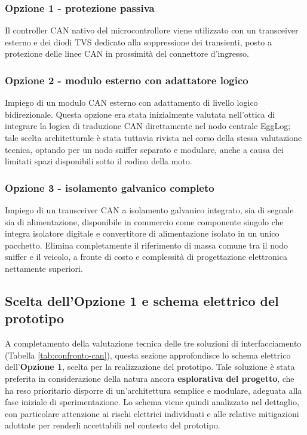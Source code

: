 \subsubsection{Opzione 1 - protezione passiva}
Il controller CAN nativo del microcontrollore viene utilizzato con un transceiver esterno e dei diodi TVS dedicato alla soppressione 
dei \gls{transienti}, posto a protezione delle linee CAN in prossimità del connettore d'ingresso.

\subsubsection{Opzione 2 - modulo esterno con adattatore logico}

Impiego di un modulo CAN esterno con adattamento di livello logico bidirezionale. Questa opzione era stata inizialmente valutata nell'ottica di 
integrare la logica di traduzione CAN direttamente nel nodo centrale EggLog; tale scelta architetturale è stata tuttavia rivista nel corso della 
stessa valutazione tecnica, optando per un nodo sniffer separato e modulare, anche a causa dei limitati spazi disponibili sotto il codino della moto.

\subsubsection{Opzione 3 - isolamento galvanico completo}
Impiego di un transceiver CAN a isolamento galvanico integrato, sia di segnale sia di alimentazione, disponibile in commercio come componente singolo che integra 
isolatore digitale e convertitore di alimentazione isolato in un unico pacchetto. Elimina completamente il riferimento di massa comune tra il nodo sniffer e il veicolo, 
a fronte di costo e complessità di progettazione elettronica nettamente superiori.

\subsection{Scelta dell'Opzione 1 e schema elettrico del prototipo}

A completamento della valutazione tecnica delle tre soluzioni di interfacciamento (Tabella \ref{tab:confronto-can}), questa sezione approfondisce lo schema elettrico 
dell'\textbf{Opzione 1}, scelta per la realizzazione del prototipo. Tale soluzione è stata preferita in considerazione della natura ancora \textbf{esplorativa del progetto}, 
che ha reso prioritario disporre di un'architettura semplice e modulare, adeguata alla fase iniziale di sperimentazione. Lo schema viene quindi analizzato nel dettaglio, 
con particolare attenzione ai rischi elettrici individuati e alle relative mitigazioni adottate per renderli accettabili nel contesto del prototipo.

